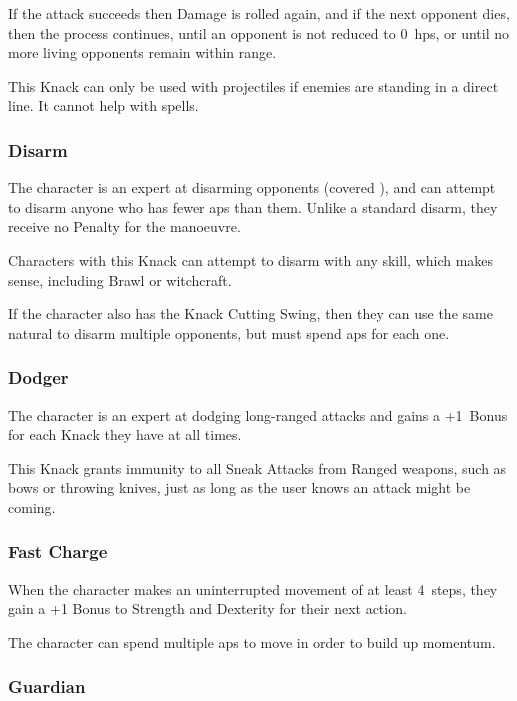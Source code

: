 \begin{multicols}{2}
If the attack succeeds then Damage is rolled again, and if the next opponent dies, then the process continues, until an opponent is not reduced to 0~\glspl{hp}, or until no more living opponents remain within range.

This Knack can only be used with \glspl{projectile} if enemies are standing in a direct line.
It cannot help with \glspl{spell}.

\subsubsection{Disarm}

The character is an expert at disarming opponents (covered ), and can attempt to disarm anyone who has fewer \glspl{ap} than them.
Unlike a standard disarm, they receive no Penalty for the manoeuvre.

Characters with this Knack can attempt to disarm with any \gls{skill}, which makes sense, including Brawl or \gls{witchcraft}.

If the character also has the Knack Cutting Swing, then they can use the same \gls{natural} to disarm multiple opponents, but must spend \glspl{ap} for each one.

\subsubsection{Dodger}
\label{dodger}

The character is an expert at dodging long-ranged attacks and gains a +1~Bonus for each Knack they have at all times.

This Knack grants immunity to all Sneak Attacks from Ranged weapons, such as bows or throwing knives, just as long as the user knows an attack might be coming.

\subsubsection{Fast Charge}

When the character makes an uninterrupted movement of at least 4~\glspl{step}, they gain a +1 Bonus to Strength and Dexterity for their next \gls{action}.

The character can spend multiple \glspl{ap} to move in order to build up momentum.

\subsubsection{Guardian}


\end{multicols}
